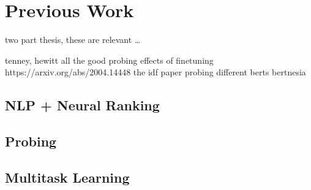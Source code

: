 \chapter{Previous Work}
\label{chap:prev}
two part thesis, these are relevant \dots

tenney, hewitt all the good probing
effects of finetuning https://arxiv.org/abs/2004.14448
the idf paper
probing different berts
bertnesia

\section{NLP + Neural Ranking}
\section{Probing}
\section{Multitask Learning}